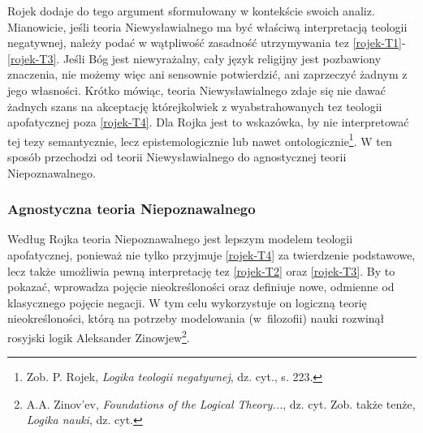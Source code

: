 Rojek dodaje do tego argument sformułowany w kontekście
swoich analiz. Mianowicie, jeśli teoria Niewysławialnego ma być
właściwą interpretacją teologii negatywnej, należy podać w wątpliwość
zasadność utrzymywania tez \eqref{rojek-T1}-\eqref{rojek-T3}. Jeśli Bóg jest
niewyrażalny, cały język religijny jest pozbawiony znaczenia, nie
możemy więc ani sensownie potwierdzić, ani zaprzeczyć żadnym z jego
własności. Krótko mówiąc, teoria Niewysławialnego zdaje się nie dawać żadnych szans na
akceptację którejkolwiek z wyabstrahowanych tez teologii apofatycznej poza \eqref{rojek-T4}.
Dla Rojka jest to wskazówka, by nie interpretować tej tezy
semantycznie, lecz epistemologicznie lub nawet
ontologicznie\footnote{Zob. P. Rojek, \textit{Logika teologii negatywnej}, dz. cyt., s. 223.}. W ten sposób przechodzi od
teorii Niewysławialnego do agnostycznej teorii Niepoznawalnego.


\subsubsection{Agnostyczna teoria Niepoznawalnego}

Według Rojka teoria Niepoznawalnego jest lepszym modelem teologii apofatycznej,
ponieważ nie tylko przyjmuje \eqref{rojek-T4} za twierdzenie podstawowe, lecz także
umożliwia pewną interpretację tez \eqref{rojek-T2} oraz \eqref{rojek-T3}. By to pokazać,
wprowadza pojęcie nieokreśloności oraz definiuje nowe, odmienne od
klasycznego pojęcie negacji. W tym celu wykorzystuje on logiczną teorię
nieokreśloności, którą na potrzeby modelowania (w~filozofii) nauki rozwinął
rosyjski logik Aleksander Zinowjew\footnote{A.A. Zinov'ev, \textit{Foundations
of the Logical Theory...}, dz. cyt. Zob. także tenże,
\textit{Logika nauki}, dz. cyt. }.

